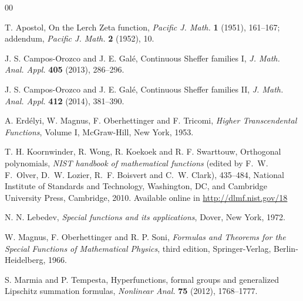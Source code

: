 \documentclass[11pt,a4paper]{amsart}
\theoremstyle{plain}
\theoremstyle{plain}
\theoremstyle{plain}
\theoremstyle{remark}
\begin{document}
\begin{thebibliography}{00}

T. Apostol,
{On the Lerch Zeta function},
\textit{Pacific J. Math.} \textbf{1} (1951), 161--167;
addendum, \textit{Pacific J. Math.} \textbf{2} (1952), 10.


J. S. Campos-Orozco and J. E. Gal\'e,
Continuous Sheffer families I,
\textit{J. Math. Anal. Appl.}
\textbf{405} (2013), 286--296.

J. S. Campos-Orozco and J. E. Gal\'e,
Continuous Sheffer families II,
\textit{J. Math. Anal. Appl.}
\textbf{412} (2014), 381--390.

A. Erd\'{e}lyi, W. Magnus, F. Oberhettinger and F. Tricomi,
\textit{Higher Transcendental Functions}, Volume I,
McGraw-Hill, New York, 1953.

T. H. Koornwinder, R. Wong, R. Koekoek and R. F. Swarttouw,
Orthogonal polynomials,
\textit{NIST handbook of mathematical functions}
(edited by F.~W. F.~Olver, D.~W. Lozier, R.~F. Boisvert and C.~W. Clark),
435--484,
National Institute of Standards and Technology, Washington, DC, and
Cambridge University Press, Cambridge, 2010.
Available online in \url{http://dlmf.nist.gov/18}

N. N. Lebedev,
\textit{Special functions and its applications},
Dover, New York, 1972.

W. Magnus, F. Oberhettinger and R. P. Soni,
\textit{Formulas and Theorems for the Special Functions of Mathematical Physics},
third edition, Springer-Verlag, Berlin-Heidelberg, 1966.

S. Marmia and P. Tempesta,
Hyperfunctions, formal groups and generalized Lipschitz summation formulas,
\textit{Nonlinear Anal.}
\textbf{75} (2012), 1768--1777.


\end{thebibliography}
\end{document}

